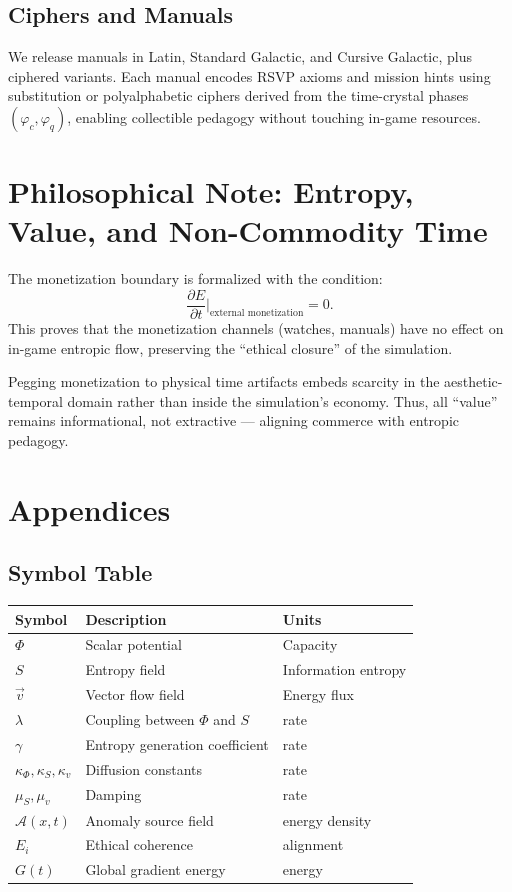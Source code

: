 \documentclass[12pt]{article}
\theoremstyle{definition}
\begin{document}
\subsection{Ciphers and Manuals}
We release manuals in Latin, Standard Galactic, and Cursive Galactic, plus ciphered variants. Each manual encodes
RSVP axioms and mission hints using substitution or polyalphabetic ciphers derived from the time-crystal phases
$(\varphi_c,\varphi_q)$, enabling collectible pedagogy without touching in-game resources.

\section{Philosophical Note: Entropy, Value, and Non-Commodity Time}
The monetization boundary is formalized with the condition:
\[
\frac{\partial E}{\partial t}\bigg|_{\text{external monetization}} = 0.
\]
This proves that the monetization channels (watches, manuals) have no effect on in-game entropic flow, preserving the “ethical closure” of the simulation.

Pegging monetization to physical time artifacts embeds scarcity in the aesthetic-temporal domain rather than inside the simulation’s economy. Thus, all “value” remains informational, not extractive — aligning commerce with entropic pedagogy.

\section{Appendices}
\subsection{Symbol Table}
\begin{tabular}{lll}
\toprule
Symbol & Description & Units \\
\midrule
$\Phi$ & Scalar potential & Capacity \\
$S$ & Entropy field & Information entropy \\
$\vec{v}$ & Vector flow field & Energy flux \\
$\lambda$ & Coupling between $\Phi$ and $S$ & rate \\
$\gamma$ & Entropy generation coefficient & rate \\
$\kappa_\Phi, \kappa_S, \kappa_v$ & Diffusion constants & rate \\
$\mu_S, \mu_v$ & Damping & rate \\
$\mathcal{A}(x,t)$ & Anomaly source field & energy density \\
$E_i$ & Ethical coherence & alignment \\
$G(t)$ & Global gradient energy & energy \\
\bottomrule
\end{tabular}
\end{document}
